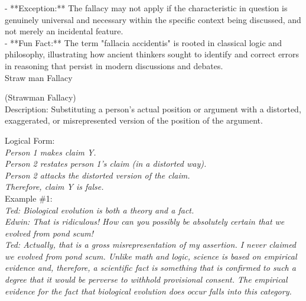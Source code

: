 \documentclass[a4paper,12pt,single,pdftex]{scrartcl}
\begin{document}
    
      - **Exception:** The fallacy may not apply if the characteristic in question is genuinely universal and necessary within the specific context being discussed, and not merely an incidental feature.
    \\

    
      - **Fun Fact:** The term "fallacia accidentis" is rooted in classical logic and philosophy, illustrating how ancient thinkers sought to identify and correct errors in reasoning that persist in modern discussions and debates.
    \\

  

Straw man Fallacy
    
      (Strawman Fallacy)
    \\

  
    Description: Substituting a person’s actual position or argument with a distorted, exaggerated, or misrepresented version of the position of the argument.

    
      Logical Form:
    \\

    
      {\em Person 1 makes claim Y.}
    \\

    
      {\em Person 2 restates person 1’s claim (in a distorted way).}
    \\

    
      {\em Person 2 attacks the distorted version of the claim.}
    \\

    
      {\em Therefore, claim Y is false.}
    \\

    
      Example \#1:
    \\

    
      {\em Ted: Biological evolution is both a theory and a fact.}
    \\

    
      {\em Edwin: That is ridiculous!  How can you possibly be absolutely certain that we evolved from pond scum!}
    \\

    
      {\em Ted: Actually, that is a gross misrepresentation of my assertion.  I never claimed we evolved from pond scum.  Unlike math and logic, science is based on empirical evidence and, therefore, a scientific fact is something that is confirmed to such a degree that it would be perverse to withhold provisional consent.  The empirical evidence for the fact that biological evolution does occur falls into this category.}
    \\
\end{document}
